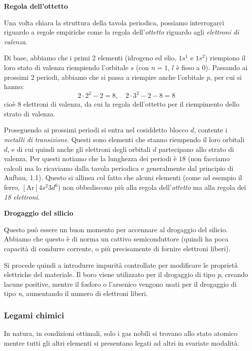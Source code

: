 \documentclass[a4paper,11pt]{article}
\begin{document}
\par\smallskip

\noindent
\textbf{\textsf{Regola dell'ottetto}}

\noindent
Una volta chiara la struttura della tavola periodica, possiamo interrogarci riguardo a regole empiriche come la regola dell'\textit{ottetto} riguardo agli \textit{elettroni di valenza}.

Di base, abbiamo che i primi 2 elementi (idrogeno ed elio, $1s^1$ e $1s^2$) riempiono il loro stato di valenza riempiendo l'orbitale $s$ (con $n = 1$, $l$ è fisso a $0$).
Passando ai prossimi 2 periodi, abbiamo che si passa a riempire anche l'orbitale $p$, per cui si hanno:
$$
2 \cdot 2^2 - 2 = 8,\quad 2 \cdot 3^2 - 2 - 8 = 8
$$
cioè $8$ elettroni di valenza, da cui la regola dell'ottetto per il riempimento dello strato di valenza.

Proseguendo ai prossimi periodi si entra nel cosiddetto blocco $d$, contente i \textit{metalli di transizione}. Questi sono elementi che stanno riempendo il loro orbitali $d$, e di cui quindi anche gli elettroni degli orbitali $d$ partecipano allo strato di valenza.
Per questi notiamo che la lunghezza dei periodi è $18$ (non facciamo calcoli ma lo ricaviamo dalla tavola periodica e generalmente dal principio di Aufbau, 1.1). Questo si allinea col fatto che alcuni elementi (come ad esempio il ferro, $[\mathrm{Ar}] 4s^2 3d^6$) non obbediscono più alla regola dell'\textit{ottetto} ma alla regola dei \textit{18 elettroni}. 

\par\smallskip

\noindent
\textbf{\textsf{Drogaggio del silicio}}

\noindent
Questo può essere un buon momento per accennare al drogaggio del silicio. Abbiamo che questo è di norma un cattivo semiconduttore (quindi ha poca capacità di condurre corrente, o più precisamente di fornire elettroni liberi).

Si procede quindi a introdurre impurità controllate per modificare le proprietà elettriche del materiale. Il boro viene utilizzato per il drogaggio di tipo \textit{p}, creando lacune positive, mentre il fosforo o l’arsenico vengono usati per il drogaggio di tipo \textit{n}, aumentando il numero di elettroni liberi.

\subsubsection{Legami chimici}
In natura, in condizioni ottimali, solo i gas nobili si trovano allo stato atomico mentre tutti gli altri elementi si presentano legati ad altri in svariate modalità.
\end{document}
